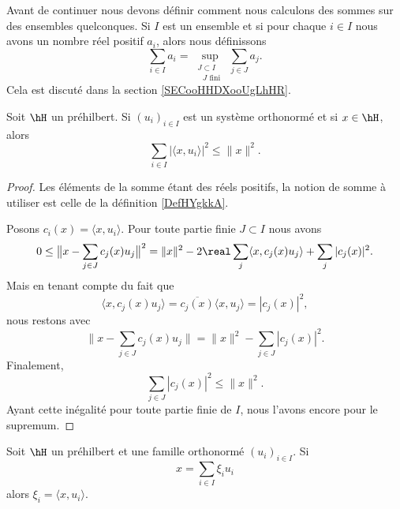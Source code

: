 Avant de continuer nous devons définir comment nous calculons des sommes sur des ensembles quelconques. Si \( I\) est un ensemble et si pour chaque \( i\in I\) nous avons un nombre réel positif \( a_i\), alors nous définissons
\begin{equation}
    \sum_{i\in I}a_i=\sup_{\substack{J\subset I\\\text{ } J\text{ fini }}}\sum_{j\in J} a_j.
\end{equation}
Cela est discuté dans la section \ref{SECooHHDXooUgLhHR}.

\begin{proposition}    \label{PropHKqVHj}
    Soit \( \hH\) un préhilbert. Si \( (u_i)_{i\in I}\) est un système orthonormé et si \( x\in \hH\), alors
    \begin{equation}        \label{EQooWCYZooOPzGaw}
        \sum_{i\in I}\big| \langle x, u_i\rangle  \big|^2\leq \| x \|^2.
    \end{equation}
\end{proposition}

\begin{proof}
    Les éléments de la somme étant des réels positifs, la notion de somme à utiliser est celle de la définition \ref{DefHYgkkA}.

    Posons \( c_i(x)=\langle x, u_i\rangle \). Pour toute partie finie \( J\subset I\) nous avons
    \begin{equation}
        0\leq \big\| x-\sum_{j\in J}c_j(x)u_j \big\|^2=\| x \|^2-2\real\sum_{j}\langle x, c_j(x)u_j\rangle +\sum_j| c_j(x) |^2.
    \end{equation}
    Mais en tenant compte du fait que 
    \begin{equation}
        \langle x, c_j(x)u_j\rangle =\overline{  c_j(x)}\langle x, u_j\rangle =| c_j(x) |^2,
    \end{equation}
    nous restons avec
    \begin{equation}    \label{EqvwXWEA}
        \| x-\sum_{j\in J}c_j(x)u_j \|=\| x \|^2-\sum_{j\in J}| c_j(x) |^2.
    \end{equation}
    Finalement,
    \begin{equation}
        \sum_{j\in J}| c_j(x) |^2\leq \| x \|^2.
    \end{equation}
    Ayant cette inégalité pour toute partie finie de \( I\), nous l'avons encore pour le supremum.
\end{proof}

\begin{proposition}     \label{PROPooWTOZooYZdlml}
    Soit \( \hH\) un préhilbert et une famille orthonormé \( (u_i)_{i\in I} \). Si 
    \begin{equation}        \label{EqitrzXi}
        x=\sum_{i\in I}\xi_iu_i
    \end{equation}
    alors \( \xi_i=\langle x, u_i\rangle \).
\end{proposition}


